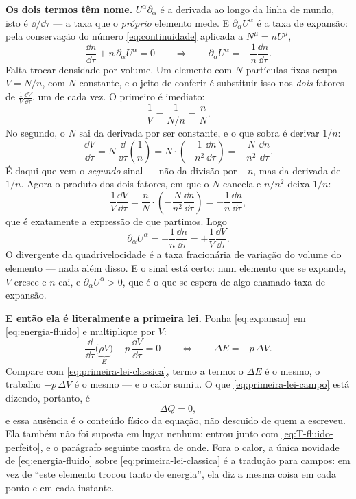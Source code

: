 \documentclass[12pt,a4paper,oneside]{book}
\theoremstyle{rgplain}
\theoremstyle{rgremark}
\begin{document}
\textbf{Os dois termos têm nome.} $U^\alpha\partial_\alpha$ é a derivada ao
longo da linha de mundo, isto é $\dd/\dd\tau$ --- a taxa que o \emph{próprio}
elemento mede. E $\partial_\alpha U^\alpha$ é a taxa de expansão: pela
conservação do número \eqref{eq:continuidade} aplicada a $N^\mu=nU^\mu$,
\[
  \frac{\dd n}{\dd\tau}+n\,\partial_\alpha U^\alpha=0
  \qquad\Longrightarrow\qquad
  \partial_\alpha U^\alpha=-\frac{1}{n}\frac{\dd n}{\dd\tau} .
\]
Falta trocar densidade por volume. Um elemento com $N$ partículas fixas ocupa
$V=N/n$, com $N$ constante, e o jeito de conferir é substituir isso nos
\emph{dois} fatores de $\frac{1}{V}\frac{\dd V}{\dd\tau}$, um de cada vez. O
primeiro é imediato:
\[
  \frac{1}{V}=\frac{1}{N/n}=\frac{n}{N} .
\]
No segundo, o $N$ sai da derivada por ser constante, e o que sobra é derivar
$1/n$:
\[
  \frac{\dd V}{\dd\tau}
   =N\,\frac{\dd}{\dd\tau}\!\left(\frac{1}{n}\right)
   =N\cdot\left(-\frac{1}{n^{2}}\frac{\dd n}{\dd\tau}\right)
   =-\frac{N}{n^{2}}\,\frac{\dd n}{\dd\tau} .
\]
É daqui que vem o \emph{segundo} sinal --- não da divisão por $-n$, mas da
derivada de $1/n$. Agora o produto dos dois fatores, em que o $N$ cancela e
$n/n^{2}$ deixa $1/n$:
\[
  \frac{1}{V}\frac{\dd V}{\dd\tau}
   =\frac{n}{N}\cdot\left(-\frac{N}{n^{2}}\frac{\dd n}{\dd\tau}\right)
   =-\frac{1}{n}\frac{\dd n}{\dd\tau} ,
\]
que é exatamente a expressão de que partimos. Logo
\begin{equation}
  \partial_\alpha U^\alpha=-\frac{1}{n}\frac{\dd n}{\dd\tau}
   =+\frac{1}{V}\frac{\dd V}{\dd\tau} .
  \label{eq:expansao}
\end{equation}
O divergente da quadrivelocidade é a taxa fracionária de variação do volume do
elemento --- nada além disso. E o sinal está certo: num elemento que se
expande, $V$ cresce e $n$ cai, e $\partial_\alpha U^\alpha>0$, que é o que se
espera de algo chamado taxa de expansão.

\textbf{E então ela é literalmente a primeira lei.} Ponha
\eqref{eq:expansao} em \eqref{eq:energia-fluido} e multiplique por $V$:
\begin{equation}
  \frac{\dd}{\dd\tau}\bigl(\underbrace{\rho V}_{E}\bigr)
   +p\,\frac{\dd V}{\dd\tau}=0
  \qquad\Longleftrightarrow\qquad
  \Delta E=-p\,\Delta V .
  \label{eq:primeira-lei-campo}
\end{equation}
Compare com \eqref{eq:primeira-lei-classica}, termo a termo: o $\Delta E$ é o
mesmo, o trabalho $-p\,\Delta V$ é o mesmo --- e o calor sumiu. O que
\eqref{eq:primeira-lei-campo} está dizendo, portanto, é
\[
  \Delta Q=0 ,
\]
e essa ausência é o conteúdo físico da equação, não descuido de quem a
escreveu. Ela também não foi suposta em lugar nenhum: entrou junto com
\eqref{eq:T-fluido-perfeito}, e o parágrafo seguinte mostra de onde. Fora o
calor, a única novidade de \eqref{eq:energia-fluido} sobre
\eqref{eq:primeira-lei-classica} é a tradução para campos: em vez de ``este
elemento trocou tanto de energia'', ela diz a mesma coisa em cada ponto e em
cada instante.
\end{document}
